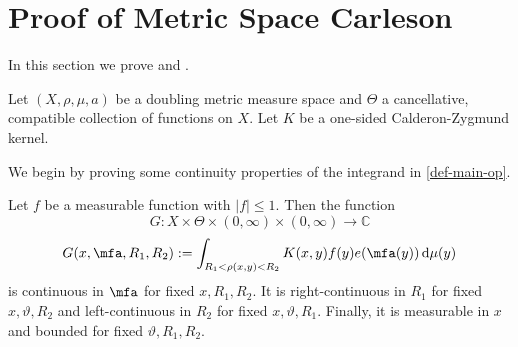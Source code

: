 \section{Proof of Metric Space Carleson}
\label{thmfromproplinear}

In this section we prove  and .

Let $(X, \rho, \mu, a)$ be a doubling metric measure space and $\Theta$ a cancellative, compatible collection of functions on $X$. Let $K$ be a one-sided Calderon-Zygmund kernel.

We begin by proving some continuity properties of the integrand in \eqref{def-main-op}.

\begin{lemma}
    \label{int-continuous}
    \leanok
    Let $f$ be a measurable function with $|f| \le 1$. Then the function
    \[
        G: X \times \Theta \times (0,\infty) \times (0, \infty) \to \mathbb{C}
    \]
    \[
        G(x, \mfa, R_1, R_2) := \int_{R_1 < \rho(x,y) < R_2} K(x,y) f(y) e(\mfa(y)) \, \mathrm{d}\mu(y)
    \]
    is continuous in $\mfa$ for fixed $x, R_1, R_2$. It is right-continuous in $R_1$ for fixed $x, \vartheta, R_2$ and left-continuous in $R_2$ for fixed $x, \vartheta, R_1$. Finally, it is measurable in $x$ and bounded for fixed $\vartheta, R_1, R_2$.
\end{lemma}

